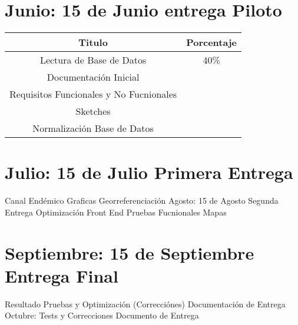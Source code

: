 \section{Junio: 15 de Junio entrega Piloto}

\begin{tabular}{|c|c|}
\hline 
Titulo & Porcentaje \\ \hline
\hline
Lectura de Base de Datos & 40\% \\ \hline
Documentación Inicial & \\ \hline
Requisitos Funcionales y No Fucnionales & \\ \hline
Sketches & \\ \hline
Normalización Base de Datos & \\ \hline

\end{tabular}

\section{Julio: 15 de Julio Primera Entrega}

Canal Endémico
Graficas
Georreferenciación
Agosto: 15 de Agosto Segunda Entrega
Optimización Front End
Pruebas Fucnionales
Mapas

\section{Septiembre: 15 de Septiembre Entrega Final}

Resultado Pruebas y Optimización (Correcciónes)
Documentación de Entrega
Octubre: Tests y Correcciones
Documento de Entrega